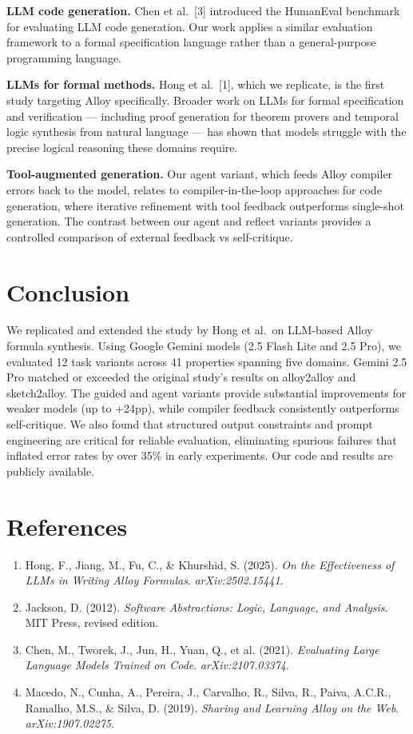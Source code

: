 \documentclass[11pt]{article}
\begin{document}
\textbf{LLM code generation.} Chen et al.\ [3] introduced the HumanEval benchmark for evaluating LLM code generation. Our work applies a similar evaluation framework to a formal specification language rather than a general-purpose programming language.

\textbf{LLMs for formal methods.} Hong et al.\ [1], which we replicate, is the first study targeting Alloy specifically. Broader work on LLMs for formal specification and verification --- including proof generation for theorem provers and temporal logic synthesis from natural language --- has shown that models struggle with the precise logical reasoning these domains require.

\textbf{Tool-augmented generation.} Our agent variant, which feeds Alloy compiler errors back to the model, relates to compiler-in-the-loop approaches for code generation, where iterative refinement with tool feedback outperforms single-shot generation. The contrast between our agent and reflect variants provides a controlled comparison of external feedback vs self-critique.

\section{Conclusion}

We replicated and extended the study by Hong et al.\ on LLM-based Alloy formula synthesis. Using Google Gemini models (2.5 Flash Lite and 2.5 Pro), we evaluated 12 task variants across 41 properties spanning five domains. Gemini 2.5 Pro matched or exceeded the original study's results on alloy2alloy and sketch2alloy. The guided and agent variants provide substantial improvements for weaker models (up to +24pp), while compiler feedback consistently outperforms self-critique. We also found that structured output constraints and prompt engineering are critical for reliable evaluation, eliminating spurious failures that inflated error rates by over 35\% in early experiments. Our code and results are publicly available.

\section*{References}

\begin{enumerate}
  \item Hong, F., Jiang, M., Fu, C., \& Khurshid, S. (2025). \emph{On the Effectiveness of LLMs in Writing Alloy Formulas}. \emph{arXiv:2502.15441}.
  \item Jackson, D. (2012). \emph{Software Abstractions: Logic, Language, and Analysis}. MIT Press, revised edition.
  \item Chen, M., Tworek, J., Jun, H., Yuan, Q., et al. (2021). \emph{Evaluating Large Language Models Trained on Code}. \emph{arXiv:2107.03374}.
  \item Macedo, N., Cunha, A., Pereira, J., Carvalho, R., Silva, R., Paiva, A.C.R., Ramalho, M.S., \& Silva, D. (2019). \emph{Sharing and Learning Alloy on the Web}. \emph{arXiv:1907.02275}.
\end{enumerate}
\end{document}
